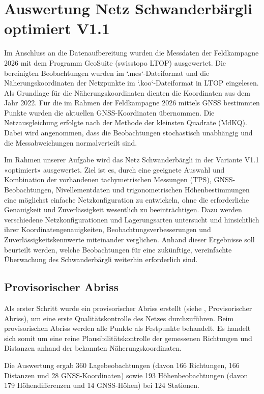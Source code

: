 \section{Auswertung Netz Schwanderbärgli optimiert V1.1}
\label{sec:auswertung netz schwanderbärgli optimiert v1.1}
Im Anschluss an die Datenaufbereitung wurden die Messdaten der
Feldkampagne 2026 mit dem Programm GeoSuite (swisstopo LTOP)
ausgewertet. Die bereinigten Beobachtungen wurden im `.mes`-Dateiformat
und die Näherungskoordinaten der Netzpunkte im `.koo`-Dateiformat in
LTOP eingelesen. Als Grundlage für die Näherungskoordinaten dienten
die Koordinaten aus dem Jahr 2022. Für die im Rahmen der Feldkampagne
2026 mittels GNSS bestimmten Punkte wurden die aktuellen
GNSS-Koordinaten übernommen. Die Netzausgleichung erfolgte nach der
Methode der kleinsten Quadrate (MdKQ). Dabei wird angenommen, dass die
Beobachtungen stochastisch unabhängig und die Messabweichungen
normalverteilt sind. \bigskip

Im Rahmen unserer Aufgabe wird das Netz Schwanderbärgli in der
Variante V1.1 «optimiert» ausgewertet. Ziel ist es, durch eine geeignete
Auswahl und Kombination der vorhandenen tachymetrischen Messungen (TPS),
GNSS-Beobachtungen, Nivellementdaten und trigonometrischen
Höhenbestimmungen eine möglichst einfache Netzkonfiguration zu
entwickeln, ohne die erforderliche Genauigkeit und Zuverlässigkeit
wesentlich zu beeinträchtigen. Dazu werden verschiedene
Netzkonfigurationen und Lagerungsarten untersucht und hinsichtlich
ihrer Koordinatengenauigkeiten, Beobachtungsverbesserungen und
Zuverlässigkeitskennwerte miteinander verglichen. Anhand dieser
Ergebnisse soll beurteilt werden, welche Beobachtungen für eine
zukünftige, vereinfachte Überwachung des Schwanderbärgli weiterhin
erforderlich sind.

\subsection{Provisorischer Abriss}
\label{sec:provisorischer abriss}
Als erster Schritt wurde ein provisorischer Abriss erstellt (siehe , Provisorischer Abriss), um eine erste
Qualitätskontrolle des Netzes durchzuführen. Beim provisorischen Abriss werden
alle Punkte als Festpunkte behandelt. Es handelt sich somit um eine reine
Plausibilitätskontrolle der gemessenen Richtungen und Distanzen anhand der
bekannten Näherungskoordinaten. \bigskip

Die Auswertung ergab 360 Lagebeobachtungen (davon 166 Richtungen, 166
Distanzen und 28 GNSS-Koordinaten) sowie 193 Höhenbeobachtungen (davon 179
Höhendifferenzen und 14 GNSS-Höhen) bei 124 Stationen. \bigskip

